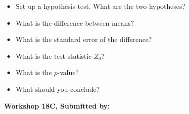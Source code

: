 \documentclass[11pt]{book}\usepackage[]{graphicx}\usepackage[]{color}
\begin{document}
\begin{exercises}
\begin{exercise}
\begin{itemize}
  \item Set up a hypothesis test. What are the two hypotheses?
  \item What is the difference between means?
  \item What is the standard error of the difference?
  \item What is the test statistic $Z_0$?
  \item What is the $p$-value?
  \item What should you conclude?
\end{itemize}

\end{exercise}
\begin{solution}  %


\end{solution}

\clearpage

    \begin{exercise}  %



    \begin{center}
\begin{flushleft}\textbf{\large \hfill Workshop 18C, Submitted by: }\end{flushleft}

\end{center}
\end{exercise}
\end{exercises}
\end{document}
